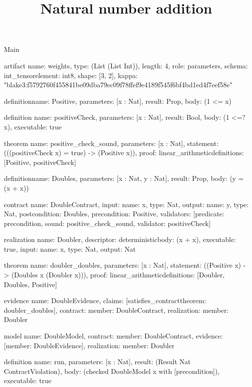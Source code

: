 \begin{lexlean}{Main}
\title{Natural number addition}
\begin{semanticmodule}
artifact{
  name: weights,
  type: (List (List Int)),
  length: 4,
  role: parameters,
  schema: int_tensor{element: int8, shape: [3, 2]},
  kappa: "blake3:f5792760f455841be09dba79ec09f78ffef9e4189f545f6bf4bd1ed4f7eef58e"
}

definition{name: Positive, parameters: [x : Nat], result: Prop, body: (1 <= x)}

definition{
  name: positiveCheck,
  parameters: [x : Nat],
  result: Bool,
  body: (1 <=? x),
  executable: true
}

theorem{
  name: positive_check_sound,
  parameters: [x : Nat],
  statement: (((positiveCheck x) = true) -> (Positive x)),
  proof: linear_arithmetic{definitions: [Positive, positiveCheck]}
}

definition{name: Doubles, parameters: [x : Nat, y : Nat], result: Prop, body: (y = (x + x))}

contract{
  name: DoubleContract,
  input: {name: x, type: Nat},
  output: {name: y, type: Nat},
  postcondition: Doubles,
  precondition: Positive,
  validators: [{predicate: precondition, sound: positive_check_sound, validator: positiveCheck}]
}

realization{
  name: Doubler,
  descriptor: deterministic{body: (x + x)},
  executable: true,
  input: {name: x, type: Nat},
  output: Nat
}

theorem{
  name: doubler_doubles,
  parameters: [x : Nat],
  statement: ((Positive x) -> (Doubles x (Doubler x))),
  proof: linear_arithmetic{definitions: [Doubler, Doubles, Positive]}
}

evidence{
  name: DoubleEvidence,
  claims: [satisfies_contract{theorem: doubler_doubles}],
  contract: {member: DoubleContract},
  realization: {member: Doubler}
}

model{
  name: DoubleModel,
  contract: {member: DoubleContract},
  evidence: [{member: DoubleEvidence}],
  realization: {member: Doubler}
}

definition{
  name: run,
  parameters: [x : Nat],
  result: (Result Nat ContractViolation),
  body: (checked DoubleModel x with [precondition]),
  executable: true
}
\end{semanticmodule}
\end{lexlean}
